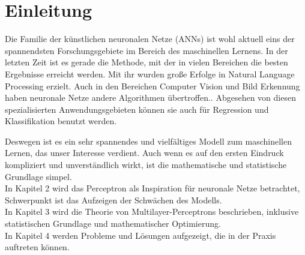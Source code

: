 \section{Einleitung}
Die Familie der künstlichen neuronalen Netze (ANNs) ist wohl aktuell eins der spannendsten Forschungsgebiete im Bereich des maschinellen Lernens. In der letzten Zeit ist es gerade die Methode, mit der in vielen Bereichen die besten Ergebnisse erreicht werden. 
Mit ihr wurden große Erfolge in Natural Language Processing erzielt. Auch in den Bereichen Computer Vision und Bild Erkennung haben neuronale Netze andere Algorithmen übertroffen.\cite{LeCun2015}. Abgesehen von diesen spezialisierten Anwendungsgebieten können sie auch für Regression und Klassifikation benutzt werden.

Deswegen ist es ein sehr spannendes und vielfältiges Modell zum maschinellen Lernen, das unser Interesse verdient. Auch wenn es auf den ersten Eindruck kompliziert und unverständlich wirkt, ist die mathematische und statistische Grundlage simpel.\\
In Kapitel 2 wird das Perceptron als Inspiration für neuronale Netze betrachtet, Schwerpunkt ist das Aufzeigen der Schwächen des Modells. \\
In Kapitel 3 wird die Theorie von Multilayer-Perceptrons beschrieben, inklusive statistischen Grundlage und mathematischer Optimierung. \\
In Kapitel 4 werden Probleme und Lösungen aufgezeigt, die in der Praxis auftreten können.
